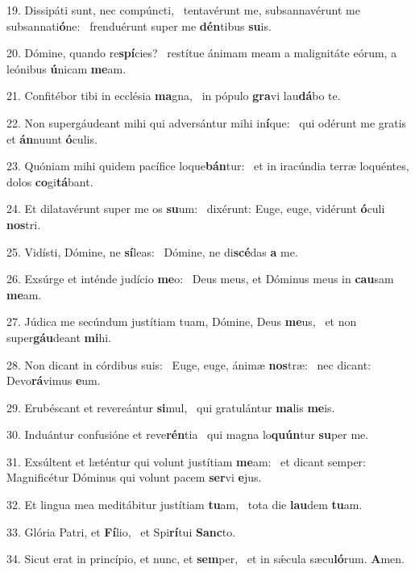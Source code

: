 19. Dissipáti sunt, nec compúncti, \dag\  tentavérunt me, subsannavérunt me subsannati\textbf{ó}ne: \ast\  frenduérunt super me \textbf{dén}tibus \textbf{su}is.\

20. Dómine, quando re\textbf{spí}cies? \ast\  restítue ánimam meam a malignitáte eórum, a leónibus \textbf{ú}nicam \textbf{me}am.\

21. Confitébor tibi in ecclésia \textbf{ma}gna, \ast\  in pópulo \textbf{gra}vi lau\textbf{dá}bo te.\

22. Non supergáudeant mihi qui adversántur mihi in\textbf{í}que: \ast\  qui odérunt me gratis et \textbf{án}nuunt \textbf{ó}culis.\

23. Quóniam mihi quidem pacífice loque\textbf{bán}tur: \ast\  et in iracúndia terræ loquéntes, dolos \textbf{co}gi\textbf{tá}bant.\

24. Et dilatavérunt super me os \textbf{su}um: \ast\  dixérunt: Euge, euge, vidérunt \textbf{ó}culi \textbf{nos}tri.\

25. Vidísti, Dómine, ne \textbf{sí}leas: \ast\  Dómine, ne di\textbf{scé}das \textbf{a} me.\

26. Exsúrge et inténde judício \textbf{me}o: \ast\  Deus meus, et Dóminus meus in \textbf{cau}sam \textbf{me}am.\

27. Júdica me secúndum justítiam tuam, Dómine, Deus \textbf{me}us, \ast\  et non super\textbf{gáu}deant \textbf{mi}hi.\

28. Non dicant in córdibus suis: \dag\  Euge, euge, ánimæ \textbf{nos}træ: \ast\  nec dicant: Devo\textbf{rá}vimus \textbf{e}um.\

29. Erubéscant et revereántur \textbf{si}mul, \ast\  qui gratulántur \textbf{ma}lis \textbf{me}is.\

30. Induántur confusióne et reve\textbf{rén}tia \ast\  qui magna lo\textbf{quún}tur \textbf{su}per me.\

31. Exsúltent et læténtur qui volunt justítiam \textbf{me}am: \ast\  et dicant semper: Magnificétur Dóminus qui volunt pacem \textbf{ser}vi \textbf{e}jus.\

32. Et lingua mea meditábitur justítiam \textbf{tu}am, \ast\  tota die \textbf{lau}dem \textbf{tu}am.\

33. Glória Patri, et \textbf{Fí}lio, \ast\  et Spi\textbf{rí}tui \textbf{Sanc}to.\

34. Sicut erat in princípio, et nunc, et \textbf{sem}per, \ast\  et in sǽcula sæcu\textbf{ló}rum. \textbf{A}men.\

